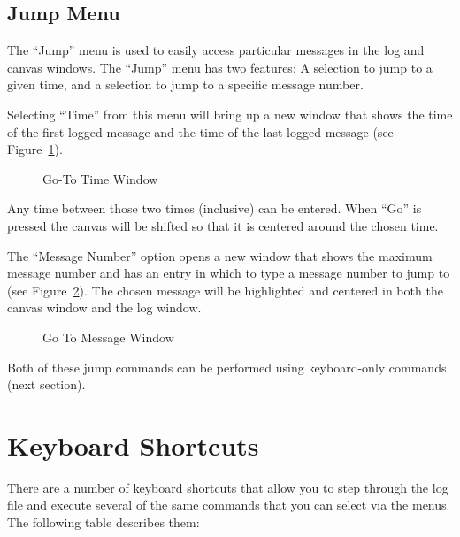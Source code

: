 \subsection{Jump Menu}

The ``Jump'' menu is used to easily access particular messages in the
log and canvas windows. The ``Jump'' menu has two features: A
selection to jump to a given time, and a selection to jump to a
specific message number.

Selecting ``Time'' from this menu will bring up a new window that shows the
time of 
the first logged message and the time of the last logged message (see
Figure~\ref{fig:gototime}).

\begin{figure}[htp]
\centerline{\epsfysize=1.3in }
\caption{Go-To Time Window}
\label{fig:gototime}
\end{figure}

Any time between those two times (inclusive) can be entered. When
``Go'' is pressed the canvas will be shifted so that it is centered
around the chosen time.

The ``Message Number'' option opens a new window that shows the
maximum message number and has an entry in which to type a message
number to jump to (see Figure~\ref{fig:gotomsg}). The chosen message
will be highlighted and centered in both the canvas window and the log
window.

\begin{figure}[htp]
\centerline{\epsfysize=0.7in }
\caption{Go To Message Window}
\label{fig:gotomsg}
\end{figure}

Both of these jump commands can be performed using keyboard-only
commands (next section).

\section{Keyboard Shortcuts}

There are a number of keyboard shortcuts that allow you to step
through the log file and execute several of the same commands that you
can select via the menus. The following table describes them:

